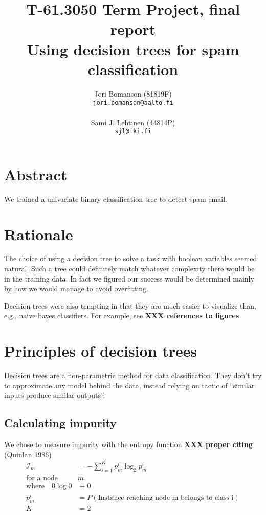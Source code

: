 \documentclass[a4paper,10pt]{article}
\title{T-61.3050 Term Project, final report\\ %
       Using decision trees for spam classification}
\author{Jori Bomanson (81819F) \\
  {\tt jori.bomanson@aalto.fi} \\
  \\
  Sami J. Lehtinen (44814P)\\ 
  {\tt sjl@iki.fi} \\
}
\newcommand{\XXX}[1]{{\bf XXX #1}}
\begin{document}

\maketitle
\thispagestyle{empty}
\pagebreak
{}

\section{Abstract}
We trained a univariate binary classification tree to detect spam email.


\section{Rationale}

The choice of using a decision tree to solve a task with boolean variables
seemed natural. Such a tree could definitely match whatever complexity there
would be in the training data.
In fact we figured our success would be determined mainly by how we would
manage to avoid overfitting.

Decision trees were also tempting in that they are much easier to
visualize than, e.g., naive bayes classifiers.  For example, see
\XXX{references to figures}

\section{Principles of decision trees}

Decision trees are a non-parametric method for data classification.
They don't try to approximate any model behind the data, instead relying
on tactic of ``similar inputs produce similar outputs''.

\subsection{Calculating impurity}

We chose to measure impurity with the entropy function \XXX{proper
citing} (Quinlan 1986)
\begin{equation*}
\begin{split}
\mathcal{I}_m &= - \sum_{i=1}^K p_m^i \log_2 p_m^i  \\
\text{for a node} \quad & m  \\
\text{where} \quad 0 \log 0 &\equiv 0  \\
p_m^i &= P(\text{Instance reaching node m belongs to class i})  \\
K &= 2
\end{split}
\end{equation*}
\end{document}
